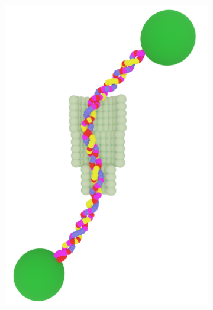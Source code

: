 \begin{figure}[ht!]
\begin{centering}
\begin{subfigure}[t]{\dimexpr.5\linewidth-1.3em\relax}
  \end{subfigure}%
  \begin{subfigure}[t]{\dimexpr.21\linewidth-1.3em\relax}
  \centering
  \vspace{0.3cm}
  \includegraphics[width=0.8\linewidth,valign=t]{Figures/Rotaxane-100.png}
  \end{subfigure}
  \label{fig:test}
  \end{centering}

  \vspace{0.05cm}


\end{figure}
